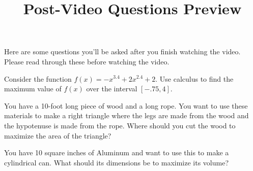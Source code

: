\documentclass[handout]{ximera}
\title{Post-Video Questions Preview}
\begin{document}
\begin{abstract}
\end{abstract}


\maketitle

Here are some questions you’ll be asked after you finish watching the video. Please read through these before watching the video.

\begin{problem}
Consider the function $f(x)=-x^{3.4}+2x^{2.4}+2$. Use calculus to find the maximum value of $f(x)$ over the interval $[-.75,4]$.
\end{problem}

\begin{problem}
You have a 10-foot long piece of wood and a long rope. You want to use these materials to make a right triangle where the legs are made from the wood and the hypotenuse is made from the rope. Where should you cut the wood to maximize the area of the triangle?
\end{problem}

\begin{problem}
You have 10 square inches of Aluminum and want to use this to make a cylindrical can. What should its dimensions be to maximize its volume?
\end{problem}
\end{document}
